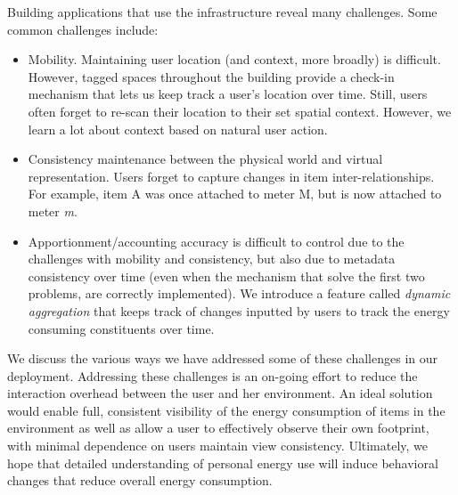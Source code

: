Building applications that use the infrastructure reveal many challenges.  Some common challenges include:

\begin{itemize}
\item Mobility.  Maintaining user location (and context, more broadly) is difficult.  However, tagged spaces throughout
		the building provide a check-in mechanism that lets us keep track a user's location over time.  Still, users
		often forget to re-scan their location to their set spatial context.  However, we learn a lot about context based
		on natural user action.
\item Consistency maintenance between the physical world and virtual representation.  Users forget to capture changes
		in item inter-relationships.  For example, item A was once attached to meter M, but is now attached to meter \emph{m}.
\item Apportionment/accounting accuracy is difficult to control due to the challenges with mobility and consistency, but also 
		due to metadata consistency over time (even when the mechanism that solve the first two problems, are correctly 
		implemented).  We introduce a feature called \emph{dynamic aggregation} that keeps track of changes inputted by users
		to track the energy consuming constituents over time.
\end{itemize}

\vspace{0.08in}


We discuss the various ways we have addressed some of these challenges in our deployment.  Addressing these challenges is an 
on-going effort to reduce the interaction overhead between the user
and her environment.  An ideal solution would enable full, consistent visibility of the energy consumption of items in the environment
as well as allow a user to effectively observe their own footprint, with minimal dependence on users maintain view consistency.  
Ultimately, we hope that detailed understanding of personal energy use will induce behavioral changes that reduce
overall energy consumption.


